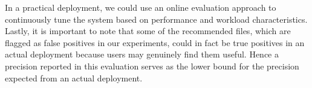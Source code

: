 In a practical deployment, we could use an online evaluation approach
to continuously tune the system based on performance and workload
characteristics.  Lastly, it is important to note that some of the
recommended files, which are flagged as false positives in our
experiments, could in fact be true positives in an actual deployment
because users may genuinely find them useful.  Hence a precision
reported in this evaluation serves as the lower bound for the
precision expected from an actual deployment.



